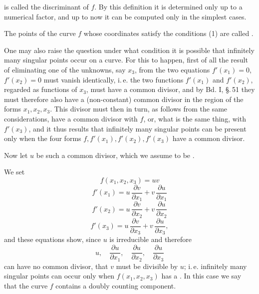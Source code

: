 is called the discriminant of $f$. By this definition it is determined only up to a numerical factor, and up to now it can be computed only in the simplest cases.

The points of the curve $f$ whose coordinates satisfy the conditions (1) are called .

One may also raise the question under what condition it is possible that infinitely many singular points occur on a curve. For this to happen, first of all the result of eliminating one of the unknowns, say $x_3$, from the two equations $f'(x_1) = 0$, $f'(x_2) = 0$ must vanish identically, i.\,e. the two functions $f'(x_1)$ and $f'(x_2)$, regarded as functions of $x_3$, must have a common divisor, and by Bd. I, \S.\,51 they must therefore also have a (non-constant) common divisor in the region of the forms $x_1, x_2, x_3$. This divisor must then in turn, as follows from the same considerations, have a common divisor with $f$, or, what is the same thing, with $f'(x_3)$, and it thus results that infinitely many singular points can be present only when the four forms $f, f'(x_1), f'(x_2), f'(x_3)$ have a common divisor.

Now let $u$ be such a common divisor, which we assume to be .

We set
\[
f(x_1, x_2, x_3) = uv
\]
\[
f'(x_1) = u\,\frac{\partial v}{\partial x_1} + v\,\frac{\partial u}{\partial x_1}
\]
\[
f'(x_2) = u\,\frac{\partial v}{\partial x_2} + v\,\frac{\partial u}{\partial x_2}
\]
\[
f'(x_3) = u\,\frac{\partial v}{\partial x_3} + v\,\frac{\partial u}{\partial x_3},
\]
and these equations show, since $u$ is irreducible and therefore
\[
u, \quad \frac{\partial u}{\partial x_1}, \quad \frac{\partial u}{\partial x_2}, \quad \frac{\partial u}{\partial x_3}
\]
can have no common divisor, that $v$ must be divisible by $u$; i.\,e. infinitely many singular points can occur only when $f(x_1, x_2, x_3)$ has a . In this case we say that the curve $f$ contains a doubly counting component.
